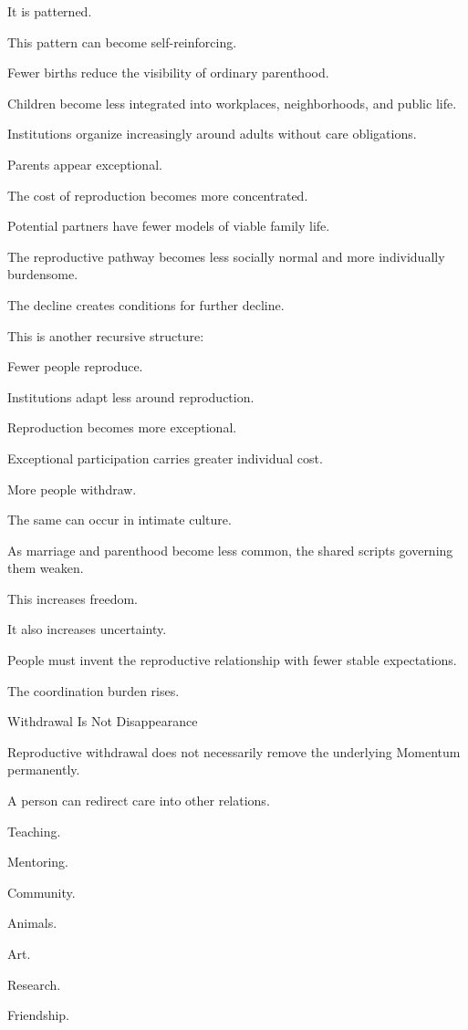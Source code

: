 It is patterned.

This pattern can become self-reinforcing.

Fewer births reduce the visibility of ordinary parenthood.

Children become less integrated into workplaces, neighborhoods, and public life.

Institutions organize increasingly around adults without care obligations.

Parents appear exceptional.

The cost of reproduction becomes more concentrated.

Potential partners have fewer models of viable family life.

The reproductive pathway becomes less socially normal and more individually burdensome.

The decline creates conditions for further decline.

This is another recursive structure:

Fewer people reproduce.

Institutions adapt less around reproduction.

Reproduction becomes more exceptional.

Exceptional participation carries greater individual cost.

More people withdraw.

The same can occur in intimate culture.

As marriage and parenthood become less common, the shared scripts governing them weaken.

This increases freedom.

It also increases uncertainty.

People must invent the reproductive relationship with fewer stable expectations.

The coordination burden rises.

Withdrawal Is Not Disappearance

Reproductive withdrawal does not necessarily remove the underlying Momentum permanently.

A person can redirect care into other relations.

Teaching.

Mentoring.

Community.

Animals.

Art.

Research.

Friendship.

